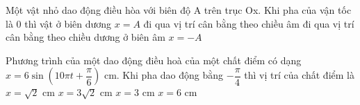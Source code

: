 \begin{ex}%
Một vật nhỏ dao động điều hòa với biên độ A trên trục Ox. Khi pha của vận tốc là 0 thì vật
\choice
{ở biên dương $x = A$}
{đi qua vị trí cân bằng theo chiều âm}
{\True đi qua vị trí cân bằng theo chiều dương}
{ở biên âm $x = -A$}
\end{ex} 
\begin{ex}%
Phương trình của một dao động điều hoà của một chất điểm có dạng $x = 6\sin\left(10\pi t + \dfrac{\pi}{6}\right)$ cm. Khi pha dao động bằng $-\dfrac{\pi}{4}$ thì vị trí của chất điểm là
\choice
{$x = \sqrt{2}$ cm}
{\True $x = 3\sqrt{2}$ cm}
{$x = 3$ cm}
{$x = 6$ cm}
\end{ex} 

